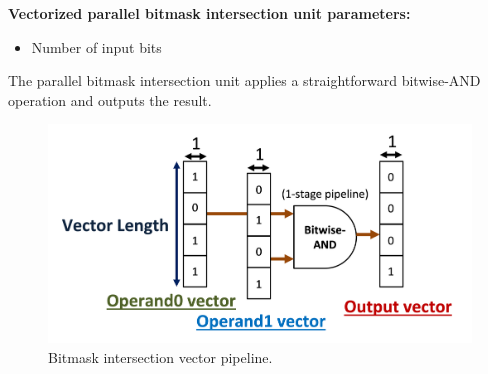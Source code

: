 \textbf{Vectorized parallel bitmask intersection unit parameters:}

\begin{itemize}
    \item Number of input bits
\end{itemize}

The parallel bitmask intersection unit applies a straightforward bitwise-AND operation and outputs the result.

\begin{figure}[H]
    \centering
    \includegraphics[width=\linewidth]{figures/bitmask_intersection.png}
    \caption{Bitmask intersection vector pipeline.}
    \label{fig:bitmask_intersection}
\end{figure}